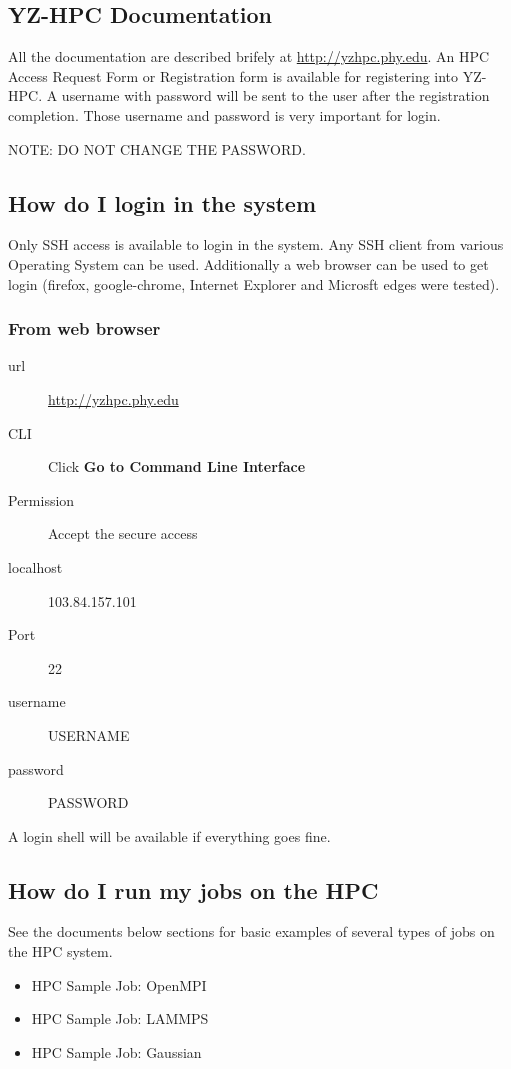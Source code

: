 \documentclass[11pt]{article}
\numberwithin{figure}{section}
\begin{document}
\subsection{YZ-HPC Documentation}
All the documentation are described brifely at \href{http://103.84.157.101} {http://yzhpc.phy.edu}. An HPC Access Request Form or Registration form is available for registering into YZ-HPC. A username with password will be sent to the user after the registration completion. Those username and password is very important for login.

NOTE: DO NOT CHANGE THE PASSWORD.

\subsection{How do I login in the system}
Only SSH access is available to login in the system. Any SSH client from
various Operating System can be used. Additionally a web browser can be used to
get login (firefox, google-chrome, Internet Explorer and Microsft edges were
tested).

\subsubsection{From web browser}

\begin{description}
    \item[url] \href{http://103.84.157.101}{http://yzhpc.phy.edu}
    \item[CLI] Click \textbf{Go to Command Line Interface}
    \item[Permission] Accept the secure access
    \item[localhost] 103.84.157.101
    \item[Port] 22
    \item[username] USERNAME
    \item[password] PASSWORD
\end{description}

A login shell will be available if everything goes fine.

\subsection{How do I run my jobs on the HPC}
See the documents below sections for basic examples of several types of jobs on
the HPC system.

\begin{itemize}
    \item HPC Sample Job: OpenMPI
    \item HPC Sample Job: LAMMPS
    \item HPC Sample Job: Gaussian
\end{itemize}
\end{document}
